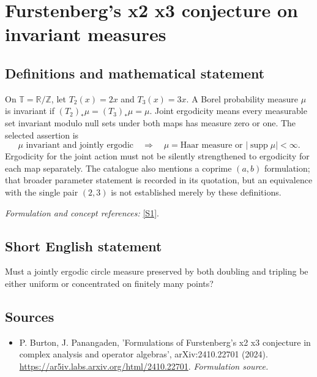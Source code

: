 \documentclass[11pt]{article}
\begin{document}
\section*{\texorpdfstring{Furstenberg's x2 x3 conjecture on invariant measures}{Furstenberg's x2 x3 conjecture on invariant measures}}\label{30006777}
\subsection{Definitions and mathematical statement}
On $\mathbb T={\mathbb{R}}/{\mathbb{Z}}$, let $T_2(x)=2x$ and $T_3(x)=3x$. A Borel probability measure $\mu$ is invariant if $(T_2)_*\mu=(T_3)_*\mu=\mu$. Joint ergodicity means every measurable set invariant modulo null sets under both maps has measure zero or one. The selected assertion is
\[
 \mu\text{ invariant and jointly ergodic}
 \quad\Longrightarrow\quad
 \mu=\text{Haar measure or }|\operatorname{supp}\mu|<\infty.
\]
Ergodicity for the joint action must not be silently strengthened to ergodicity for each map separately. The catalogue also mentions a coprime $(a,b)$ formulation; that broader parameter statement is recorded in its quotation, but an equivalence with the single pair $(2,3)$ is not established merely by these definitions.
\par\smallskip\textit{Formulation and concept references:} \href{https://ar5iv.labs.arxiv.org/html/2410.22701}{[S1]}.

\subsection{Short English statement}
Must a jointly ergodic circle measure preserved by both doubling and tripling be either uniform or concentrated on finitely many points?
\subsection{Sources}
\begin{itemize}
\item[S1]P. Burton, J. Panangaden, 'Formulations of Furstenberg's x2 x3 conjecture in complex analysis and operator algebras', arXiv:2410.22701 (2024).
\url{https://ar5iv.labs.arxiv.org/html/2410.22701}.
\textit{Formulation source.}
\end{itemize}
\end{document}
